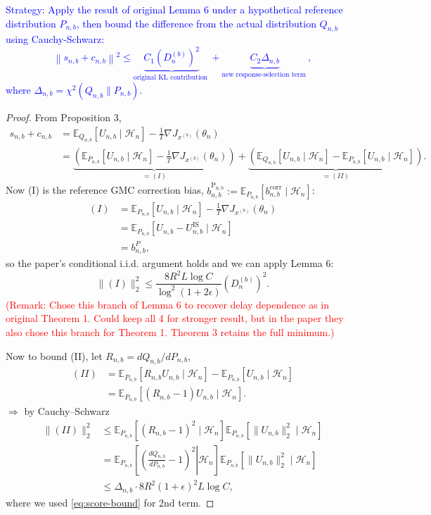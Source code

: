 \documentclass[10pt]{article}
\newcommand{\E}{\mathbb{E}}
\newcommand{\Hh}{\mathcal{H}}
\newcommand{\grad}{\nabla}
\theoremstyle{preserved}
\begin{document}
\textcolor{blue}{Strategy: Apply the result of original Lemma 6 under a hypothetical reference distribution $P_{n, b}$, then bound the difference from the actual distribution $Q_{n, b}$ using Cauchy-Schwarz:
$$
\left\|s_{n, b}+c_{n, b}\right\|^2 \leq \underbrace{C_1\left(D_n^{(b)}\right)^2}_{\text {original KL contribution }}+\underbrace{C_2 \Delta_{n, b}}_{\text {new response-selection term }},
$$
where $\Delta_{n, b}=\chi^2\left(Q_{n, b} \| P_{n, b}\right)$.}

\begin{proof} From Proposition 3,
\begin{equation}\label{eq:bias-decomposition}
\begin{aligned}
s_{n,b}+c_{n,b}&=\E_{Q_{n,b}}[U_{n,b}\mid\Hh_n]-\frac1T\grad J_{x^{(b)}}(\theta_n)\\
&=\underbrace{\left(\E_{P_{n,b}}[U_{n,b}\mid\Hh_n]-\frac1T\grad J_{x^{(b)}}(\theta_n)\right)}_{=(I)}
+\underbrace{\left(\E_{Q_{n,b}}[U_{n,b}\mid\Hh_n]-\E_{P_{n,b}}[U_{n,b}\mid\Hh_n]\right)}_{=(II)}.
\end{aligned}
\end{equation}
Now (I) is the reference GMC correction bias, $b_{n,b}^{\mathrm{P_{n,b}}}:=\E_{P_{n,b}}[b_{n,b}^{\mathrm{corr}}\mid\Hh_n]$:
\begin{align*}(I) & =\E_{P_{n,b}}\left[U_{n, b} \mid \mathcal{H}_n\right]-\frac{1}{T} \nabla J_{x^{(b)}}\left(\theta_n\right) \\ & =\E_{P_{n,b}}\left[U_{n, b}-U_{n, b}^{\mathrm{IS}} \mid \mathcal{H}_n\right] \\ & =b_{n, b}^P,\end{align*}
so the paper's conditional i.i.d. argument holds and we can apply Lemma 6:
\begin{equation*}
\|(I)\|_2^2\le\frac{8R^2L\log C}{\log^2(1+2\epsilon)}(D_n^{(b)})^2.
\end{equation*}
\textcolor{red}{(Remark: Chose this branch of Lemma 6 to recover delay dependence as in original Theorem 1. Could keep all 4 for stronger result, but in the paper they also chose this branch for Theorem 1. Theorem 3 retains the full minimum.)}

Now to bound (II), let $R_{n,b}=dQ_{n,b}/dP_{n,b}$,
\begin{equation}
\begin{aligned}
(II)&=\E_{P_{n,b}}[R_{n,b}U_{n,b}\mid\Hh_n]-\E_{P_{n,b}}[U_{n,b}\mid\Hh_n]\\
&=\E_{P_{n,b}}[(R_{n,b}-1)U_{n,b}\mid\Hh_n].
\end{aligned}\label{eq:step-6}
\end{equation}
$\Rightarrow$ by Cauchy--Schwarz
\begin{equation}
\begin{aligned}
\|(II)\|_2^2
&\le\E_{P_{n,b}}[(R_{n,b}-1)^2\mid\Hh_n]\E_{P_{n,b}}[\|U_{n,b}\|_2^2\mid\Hh_n]\\
&=\E_{P_{n,b}}\left[\left.\left(\frac{dQ_{n,b}}{dP_{n,b}}-1\right)^2\right|\Hh_n\right]\E_{P_{n,b}}[\|U_{n,b}\|_2^2\mid\Hh_n]\\
&\le\Delta_{n,b}\cdot8R^2(1+\epsilon)^2L\log C,
\end{aligned}\label{eq:step-7}
\end{equation}
where we used \eqref{eq:score-bound} for 2nd term.


\end{proof}
\end{document}
